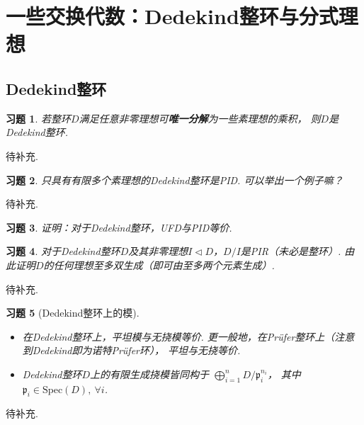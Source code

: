\newcommand{\spec}{\mathrm{Spec}}
\newcommand{\Q}{\mathbb{Q}}
\newcommand{\C}{\mathbb{C}}
\newcommand{\Gal}{\operatorname{Gal}}
\newcommand{\GL}{\mathrm{GL}}
\renewcommand{\mod}{\operatorname{mod}}
\newcommand{\char}{\operatorname{char}}

\newtheorem{exercise}{习题}

\section{一些交换代数：Dedekind整环与分式理想}
\subsection{Dedekind整环}
\begin{exercise}
若整环$D$满足任意非零理想可\textbf{唯一分解}为一些素理想的乘积，
则$D$是Dedekind整环.
\end{exercise}
\begin{proofc}
待补充.
\end{proofc}

\begin{exercise}
    只具有有限多个素理想的Dedekind整环是PID. 可以举出一个例子嘛？
\end{exercise}
\begin{proofc}
待补充.
\end{proofc}

\begin{exercise}
    证明：对于Dedekind整环，UFD与PID等价.
\end{exercise}

\begin{exercise}
    对于Dedekind整环$D$及其非零理想$I \lhd D$，$D/I$是PIR（未必是整环）.
    由此证明$D$的任何理想至多双生成（即可由至多两个元素生成）.
\end{exercise}
\begin{proofc}
待补充.
\end{proofc}

\begin{exercise}[Dedekind整环上的模]
    \begin{itemize}
        \item[(1)]
        在Dedekind整环上，平坦模与无挠模等价. 
        更一般地，在Prüfer整环上（注意到Dedekind即为诺特Prüfer环），
        平坦与无挠等价.

        \item[(2)]
        Dedekind整环$D$上的有限生成挠模皆同构于
        $\bigoplus_{i = 1}^{n}D/\mathfrak{p}_{i}^{n_{i}}$，
        其中$\mathfrak{p}_{i} \in \spec(D), \ \forall i$.
    \end{itemize}
\end{exercise}
\begin{proofc}
待补充.
\end{proofc}

